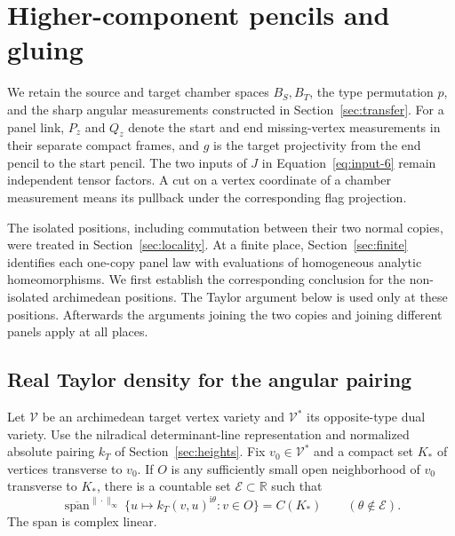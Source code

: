 \section{Higher-component pencils and gluing}
\label{sec:gluing}

We retain the source and target chamber spaces $B_S,B_T$, the type
permutation $p$, and the sharp angular measurements constructed in
Section~\ref{sec:transfer}.  For a panel link, $P_z$ and $Q_z$ denote
the start and end missing-vertex measurements in their separate compact
frames, and $g$ is the target projectivity from the end pencil to the
start pencil.  The two inputs of $J$ in Equation~\eqref{eq:input-6}
remain independent tensor factors.  A cut on a vertex coordinate of a
chamber measurement means its pullback under the corresponding flag
projection.

The isolated positions, including commutation between their two normal
copies, were treated in Section~\ref{sec:locality}.  At a finite place,
Section~\ref{sec:finite} identifies each one-copy panel law with
evaluations of homogeneous analytic homeomorphisms.  We first establish
the corresponding conclusion for the non-isolated archimedean
positions.  The Taylor argument below is used only at these positions.
Afterwards the arguments joining the two copies and joining different
panels apply at all places.

\subsection{Real Taylor density for the angular pairing}

\begin{lemma}
\label{lem:gluing-taylor-density}
Let $\mathcal V$ be an archimedean target vertex variety and
$\mathcal V^*$ its opposite-type dual variety.  Use the nilradical
determinant-line representation and normalized absolute pairing
$k_T$ of Section~\ref{sec:heights}.  Fix $v_0\in\mathcal V^*$ and a
compact set $K_*$ of vertices transverse to $v_0$.  If $O$ is any
sufficiently small open neighborhood of $v_0$ transverse to $K_*$,
there is a countable set $\mathcal E\subset\mathbb R$ such that
\[
 \overline{\operatorname{span}}^{\|\cdot\|_\infty}
 \{u\mapsto k_T(v,u)^{\mathrm i\theta}:v\in O\}=C(K_*)
 \qquad(\theta\notin\mathcal E).
\]
The span is complex linear.
\end{lemma}

